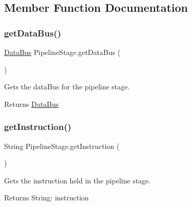 \subsection{Member Function Documentation}
\mbox{\label{class_pipeline_stage_a132fd57aa34d80eb12ac7b228d29d32e}} 
\subsubsection{\texorpdfstring{get\+Data\+Bus()}{getDataBus()}}
{\footnotesize\ttfamily \mbox{\hyperlink{class_data_bus}{Data\+Bus}} Pipeline\+Stage.\+get\+Data\+Bus (\begin{DoxyParamCaption}{ }\end{DoxyParamCaption})\hspace{0.3cm}{\ttfamily [package]}}

Gets the data\+Bus for the pipeline stage. \begin{DoxyReturn}{Returns}
\mbox{\hyperlink{class_data_bus}{Data\+Bus}} 
\end{DoxyReturn}
\mbox{\label{class_pipeline_stage_a0716fd5bf42bb11790bf8ab6568dc22d}} 
\subsubsection{\texorpdfstring{get\+Instruction()}{getInstruction()}}
{\footnotesize\ttfamily String Pipeline\+Stage.\+get\+Instruction (\begin{DoxyParamCaption}{ }\end{DoxyParamCaption})\hspace{0.3cm}{\ttfamily [package]}}

Gets the instruction held in the pipeline stage.

\begin{DoxyReturn}{Returns}
String\+: instruction 
\end{DoxyReturn}
\mbox{\label{class_pipeline_stage_a935e03d46a543f261995097c044fd655}} 
